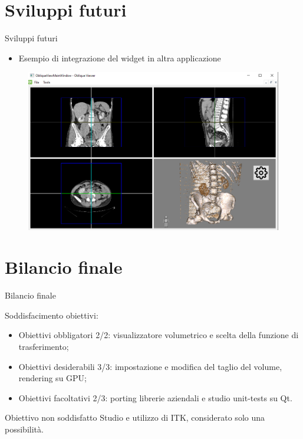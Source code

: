 \documentclass{beamer}
\begin{document}
	
	\section{Sviluppi futuri}
	\begin{frame}{Sviluppi futuri}	
	
	\begin{itemize}
		\item Esempio di integrazione del widget in altra applicazione
	\end{itemize}
	
	\begin{figure}[ht]
    	\centering
    	\includegraphics[width=.8\textwidth]{Images/obliqueview.png}
	\end{figure}
	
	\end{frame}
	
	
	\section{Bilancio finale}
	\begin{frame}{Bilancio finale}
	
	Soddisfacimento obiettivi:
	\begin{itemize}
		\item Obiettivi obbligatori 2/2: visualizzatore volumetrico e scelta della funzione di trasferimento;
		\item Obiettivi desiderabili 3/3: impostazione e modifica del taglio del volume, rendering su GPU;
		\item Obiettivi facoltativi 2/3: porting librerie aziendali e studio unit-tests su Qt.
	\end{itemize}
	
	\begin{exampleblock}{Obiettivo non soddisfatto}
	Studio e utilizzo di ITK, considerato solo una possibilità.
	\end{exampleblock}
	
	\end{frame}
	
\end{document}
